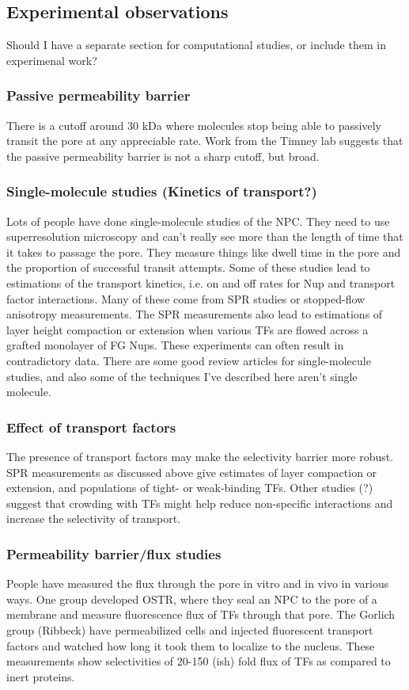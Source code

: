 \subsection{Experimental observations} Should I have a separate section for computational studies, or include them in experimenal work?
\subsubsection{Passive permeability barrier}
There is a cutoff around 30 kDa where molecules stop being able to passively transit the pore at any appreciable rate.  Work from the Timney lab suggests that the passive permeability barrier is not a sharp cutoff, but broad.
\subsubsection{Single-molecule studies (Kinetics of transport?)}
Lots of people have done single-molecule studies of the NPC.  They need to use superresolution microscopy and can't really see more than the length of time that it takes to passage the pore.  They measure things like dwell time in the pore and the proportion of successful transit attempts.  Some of these studies lead to estimations of the transport kinetics, i.e. on and off rates for Nup and transport factor interactions.  Many of these come from SPR studies or stopped-flow anisotropy measurements.  The SPR measurements also lead to estimations of layer height compaction or extension when various TFs are flowed across a grafted monolayer of FG Nups.  These experiments can often result in contradictory data.  There are some good review articles for single-molecule studies, and also some of the techniques I've described here aren't single molecule.
\subsubsection{Effect of transport factors}
The presence of transport factors may make the selectivity barrier more robust.  SPR measurements as discussed above give estimates of layer compaction or extension, and populations of tight- or weak-binding TFs.  Other studies (?) suggest that crowding with TFs might help reduce non-specific interactions and increase the selectivity of transport.
\subsubsection{Permeability barrier/flux studies}
People have measured the flux through the pore in vitro and in vivo in various ways.  One group developed OSTR, where they seal an NPC to the pore of a membrane and measure fluorescence flux of TFs through that pore.  The Gorlich group (Ribbeck) have permeabilized cells and injected fluorescent transport factors and watched how long it took them to localize to the nucleus.  These measurements show selectivities of 20-150 (ish) fold flux of TFs as compared to inert proteins.
